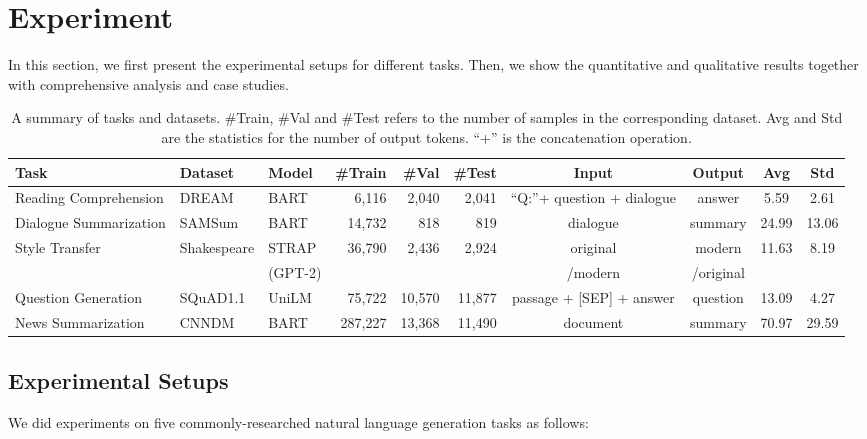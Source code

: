 \section{Experiment}
\label{sec:experiment}
In this section,
we first present the experimental setups for different tasks. Then, we show the quantitative and qualitative results together with comprehensive analysis and case studies.

\begin{table*}[th]
	\scriptsize
	\centering
	\begin{tabular}{lp{1.1cm}p{0.9cm}rrrcccc}
		\hline
		Task & Dataset & Model & \#Train & \#Val & \#Test & Input & Output & Avg & Std\\
		\hline
		Reading Comprehension & DREAM &BART& 6,116 & 2,040 & 2,041 & ``Q:''+ question + dialogue & answer & 5.59 & 2.61\\
		Dialogue Summarization & SAMSum &BART& 14,732 & 818 & 819 & dialogue & summary  & 24.99 & 13.06\\
		\multirow{2}{*}{Style Transfer} & \multirow{2}{*}{Shakespeare} &{STRAP}&  \multirow{2}{*}{36,790} &  \multirow{2}{*}{2,436} &  \multirow{2}{*}{2,924} & {original}  & {modern}  &  \multirow{2}{*}{11.63} & \multirow{2}{*}{8.19} \\
		&&(GPT-2) &  & && /modern& /original & & \\
		Question Generation & SQuAD1.1 &UniLM& 75,722 & 10,570 & 11,877 & passage + [SEP] + answer & question & 13.09 & 4.27 \\
		News Summarization & CNNDM &BART& 287,227& 13,368& 11,490 & document & summary & 70.97 & 29.59\\ 
		\hline
	\end{tabular}
	\caption{A summary of tasks and datasets. \#Train, \#Val and \#Test refers to the number of samples in the corresponding dataset. Avg and Std are the statistics for the number of output tokens. ``+'' is the concatenation operation.}
	\label{tab:taskdata}
\end{table*}
\subsection{Experimental Setups}
\label{sec:implementation}
We did experiments on five commonly-researched natural language generation tasks as follows:%



